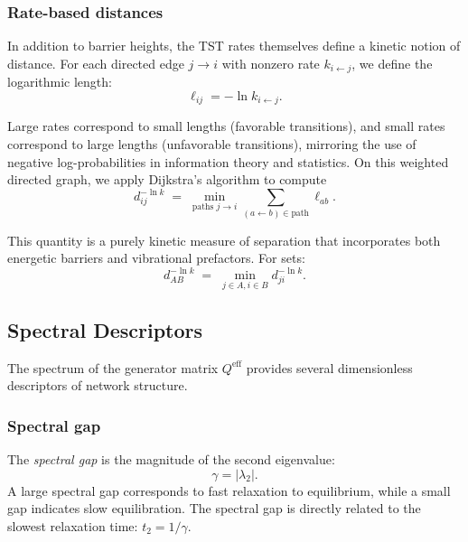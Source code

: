 \subsubsection{Rate-based distances}

In addition to barrier heights, the TST rates themselves define a kinetic notion of
distance. For each directed edge $j \to i$ with nonzero rate $k_{i \leftarrow j}$, we
define the logarithmic length:
\begin{equation}\label{eq:log-length}
  \ell_{ij} = -\ln k_{i \leftarrow j}.
\end{equation}

Large rates correspond to small lengths (favorable transitions), and small rates
correspond to large lengths (unfavorable transitions), mirroring the use of negative
log-probabilities in information theory and statistics. On this weighted directed graph,
we apply Dijkstra's algorithm to compute
\begin{equation}
  d^{-\ln k}_{ij}
  \;=\;
  \min_{\text{paths } j \to i}
  \sum_{(a \leftarrow b) \in \text{path}} \ell_{ab}.
\end{equation}

This quantity is a purely kinetic measure of separation that incorporates both
energetic barriers and vibrational prefactors. For sets:
\begin{equation}
  d^{-\ln k}_{AB}
  \;=\;
  \min_{j \in A, i \in B} d^{-\ln k}_{ji}.
\end{equation}

\subsection{Spectral Descriptors}\label{subsec:spectral}

The spectrum of the generator matrix $Q^{\mathrm{eff}}$ provides several
dimensionless descriptors of network structure.

\subsubsection{Spectral gap}

The \emph{spectral gap} is the magnitude of the second eigenvalue:
\begin{equation}
  \gamma = |\lambda_2|.
\end{equation}
A large spectral gap corresponds to fast relaxation to equilibrium, while a small gap
indicates slow equilibration. The spectral gap is directly related to the slowest
relaxation time: $t_2 = 1/\gamma$.

